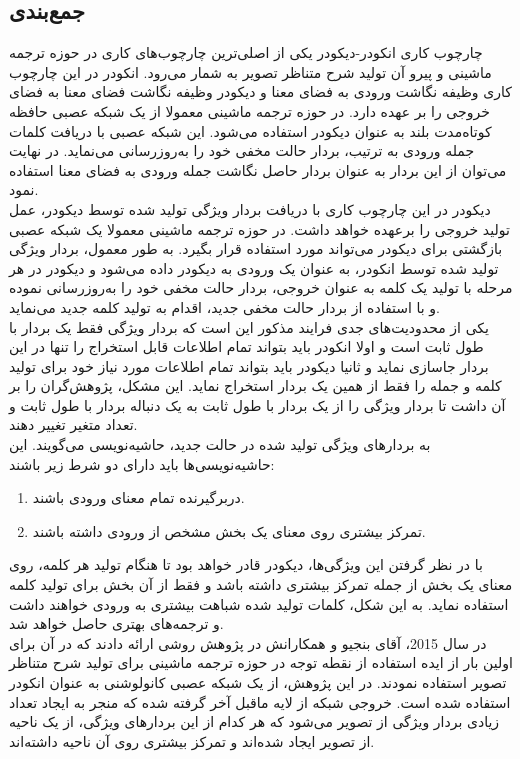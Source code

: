 \subsection{جمع‌بندی}

چارچوب کاری انکودر-دیکودر یکی از اصلی‌ترین چارچوب‌های کاری در حوزه ترجمه ماشینی و پیرو آن تولید شرح متناظر تصویر به شمار می‌رود. انکودر در این چارچوب کاری وظیفه نگاشت ورودی به فضای معنا و دیکودر وظیفه نگاشت فضای معنا به فضای خروجی را بر عهده دارد. در حوزه ترجمه ماشینی معمولا از یک شبکه عصبی حافظه کوتاه‌مدت بلند به عنوان دیکودر استفاده می‌شود. این شبکه عصبی با دریافت کلمات جمله ورودی به ترتیب، بردار حالت مخفی خود را به‌روز‌رسانی می‌نماید. در نهایت می‌توان از این بردار به عنوان بردار حاصل نگاشت جمله ورودی به فضای معنا استفاده نمود.
\\
دیکودر در این چارچوب کاری با دریافت بردار ویژگی تولید شده توسط دیکودر، عمل تولید خروجی را برعهده خواهد داشت. در حوزه ترجمه ماشینی معمولا یک شبکه عصبی بازگشتی برای دیکودر می‌تواند مورد استفاده قرار بگیرد. به طور معمول، بردار ویژگی تولید شده توسط انکودر، به عنوان یک ورودی به دیکودر داده می‌شود و دیکودر در هر مرحله با تولید یک کلمه به عنوان خروجی، بردار حالت مخفی خود را به‌روزرسانی نموده و با استفاده از بردار حالت مخفی جدید، اقدام به تولید کلمه جدید می‌نماید.
\\
یکی از محدودیت‌های جدی فرایند مذکور این است که بردار ویژگی فقط یک بردار با طول ثابت است و اولا انکودر باید بتواند تمام اطلاعات قابل استخراج را تنها در این بردار جاسازی نماید و ثانیا دیکودر باید بتواند تمام اطلاعات مورد نیاز خود برای تولید کلمه و جمله را فقط از همین یک بردار استخراج نماید. این مشکل، پژوهش‌گران را بر آن داشت تا بردار ویژگی را از یک بردار با طول ثابت به یک دنباله بردار با طول ثابت و تعداد متغیر تغییر دهند. 
\\
به بردارهای ویژگی تولید شده در حالت جدید، حاشیه‌نویسی می‌گویند. این حاشیه‌نویسی‌ها باید دارای دو شرط زیر باشند:
\begin{enumerate}
\item دربرگیرنده تمام معنای ورودی باشند.
\item تمرکز بیشتری روی معنای یک بخش مشخص از ورودی داشته باشند.
\end{enumerate}
با در نظر گرفتن این ویژگی‌ها، دیکودر قادر خواهد بود تا هنگام تولید هر کلمه، روی معنای یک بخش از جمله تمرکز بیشتری داشته باشد و فقط از آن بخش برای تولید کلمه استفاده نماید. به این شکل، کلمات تولید شده شباهت بیشتری به ورودی خواهند داشت و ترجمه‌های بهتری حاصل خواهد شد. 
\\
در سال 2015، آقای بنجیو و همکارانش در پژوهش \cite{xu2015show} روشی ارائه دادند که در آن برای اولین بار از ایده استفاده از نقطه توجه در حوزه ترجمه ماشینی برای تولید شرح متناظر تصویر استفاده نمودند. در این پژوهش، از یک شبکه عصبی کانولوشنی به عنوان انکودر استفاده شده است. خروجی شبکه از لایه ماقبل آخر گرفته شده که منجر به ایجاد تعداد زیادی بردار ویژگی از تصویر می‌شود که هر کدام از این بردارهای ویژگی، از یک ناحیه از تصویر ایجاد شده‌اند و تمرکز بیشتری روی آن ناحیه داشته‌اند. 
